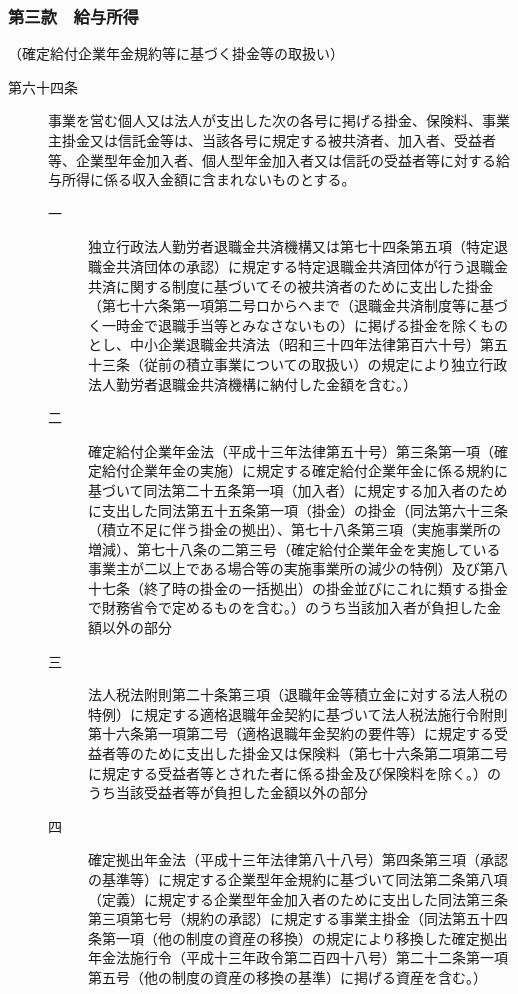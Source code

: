 \documentclass[twocolumn,a4j,10pt]{ltjtarticle}
\begin{document}
\subsubsection*{第三款　給与所得}
\noindent\hspace{10pt}（確定給付企業年金規約等に基づく掛金等の取扱い）
\begin{description}
\item[第六十四条]事業を営む個人又は法人が支出した次の各号に掲げる掛金、保険料、事業主掛金又は信託金等は、当該各号に規定する被共済者、加入者、受益者等、企業型年金加入者、個人型年金加入者又は信託の受益者等に対する給与所得に係る収入金額に含まれないものとする。
\begin{description}
\item[一]独立行政法人勤労者退職金共済機構又は第七十四条第五項（特定退職金共済団体の承認）に規定する特定退職金共済団体が行う退職金共済に関する制度に基づいてその被共済者のために支出した掛金（第七十六条第一項第二号ロからヘまで（退職金共済制度等に基づく一時金で退職手当等とみなさないもの）に掲げる掛金を除くものとし、中小企業退職金共済法（昭和三十四年法律第百六十号）第五十三条（従前の積立事業についての取扱い）の規定により独立行政法人勤労者退職金共済機構に納付した金額を含む。）
\item[二]確定給付企業年金法（平成十三年法律第五十号）第三条第一項（確定給付企業年金の実施）に規定する確定給付企業年金に係る規約に基づいて同法第二十五条第一項（加入者）に規定する加入者のために支出した同法第五十五条第一項（掛金）の掛金（同法第六十三条（積立不足に伴う掛金の拠出）、第七十八条第三項（実施事業所の増減）、第七十八条の二第三号（確定給付企業年金を実施している事業主が二以上である場合等の実施事業所の減少の特例）及び第八十七条（終了時の掛金の一括拠出）の掛金並びにこれに類する掛金で財務省令で定めるものを含む。）のうち当該加入者が負担した金額以外の部分
\item[三]法人税法附則第二十条第三項（退職年金等積立金に対する法人税の特例）に規定する適格退職年金契約に基づいて法人税法施行令附則第十六条第一項第二号（適格退職年金契約の要件等）に規定する受益者等のために支出した掛金又は保険料（第七十六条第二項第二号に規定する受益者等とされた者に係る掛金及び保険料を除く。）のうち当該受益者等が負担した金額以外の部分
\item[四]確定拠出年金法（平成十三年法律第八十八号）第四条第三項（承認の基準等）に規定する企業型年金規約に基づいて同法第二条第八項（定義）に規定する企業型年金加入者のために支出した同法第三条第三項第七号（規約の承認）に規定する事業主掛金（同法第五十四条第一項（他の制度の資産の移換）の規定により移換した確定拠出年金法施行令（平成十三年政令第二百四十八号）第二十二条第一項第五号（他の制度の資産の移換の基準）に掲げる資産を含む。）

\end{description}
\end{description}
\end{document}
